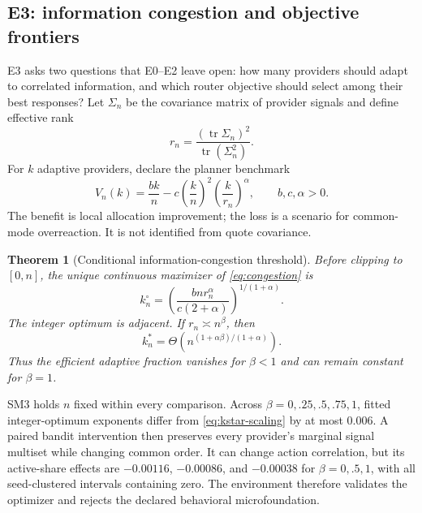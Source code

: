 \documentclass[10pt]{article}
\newtheorem{theorem}{Theorem}
\newcommand{\1}{\mathbf 1}
\begin{document}
\subsection{E3: information congestion and objective frontiers}

E3 asks two questions that E0--E2 leave open: how many providers should adapt to
correlated information, and which router objective should select among their
best responses?  Let $\Sigma_n$ be the covariance matrix of provider signals and
define effective rank
\begin{equation}
r_n=\frac{(\operatorname{tr}\Sigma_n)^2}
{\operatorname{tr}(\Sigma_n^2)}.
\end{equation}
For $k$ adaptive providers, declare the planner benchmark
\begin{equation}
V_n(k)=\frac{bk}{n}-c\left(\frac{k}{n}\right)^2
\left(\frac{k}{r_n}\right)^\alpha,
\qquad b,c,\alpha>0.
\label{eq:congestion}
\end{equation}
The benefit is local allocation improvement; the loss is a scenario for
common-mode overreaction.  It is not identified from quote covariance.

\begin{theorem}[Conditional information-congestion threshold]
Before clipping to $[0,n]$, the unique continuous maximizer of
\cref{eq:congestion} is
\begin{equation}
k_n^\circ=\left(\frac{b n r_n^\alpha}{c(2+\alpha)}\right)^{1/(1+\alpha)}.
\end{equation}
The integer optimum is adjacent.  If $r_n\asymp n^\beta$, then
\begin{equation}
k_n^*=\Theta\!\left(n^{(1+\alpha\beta)/(1+\alpha)}\right).
\label{eq:kstar-scaling}
\end{equation}
Thus the efficient adaptive fraction vanishes for $\beta<1$ and can remain
constant for $\beta=1$.
\label{thm:congestion}
\end{theorem}

SM3 holds $n$ fixed within every comparison.  Across
$\beta=0,.25,.5,.75,1$, fitted integer-optimum exponents differ from
\cref{eq:kstar-scaling} by at most 0.006.  A paired bandit intervention then
preserves every provider's marginal signal multiset while changing common
order.  It can change action correlation, but its active-share effects are
$-0.00116$, $-0.00086$, and $-0.00038$ for $\beta=0,.5,1$, with all
seed-clustered intervals containing zero.  The environment therefore validates
the optimizer and rejects the declared behavioral microfoundation.
\end{document}
